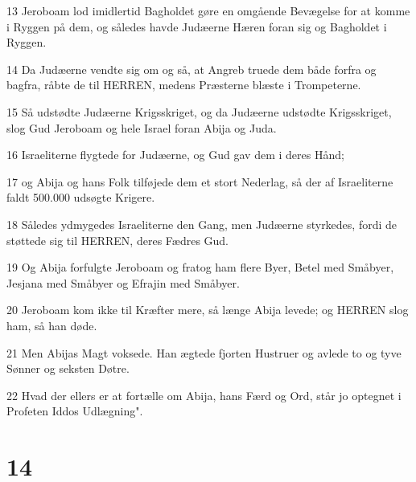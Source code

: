 \par 13 Jeroboam lod imidlertid Bagholdet gøre en omgående Bevægelse for at komme i Ryggen på dem, og således havde Judæerne Hæren foran sig og Bagholdet i Ryggen.
\par 14 Da Judæerne vendte sig om og så, at Angreb truede dem både forfra og bagfra, råbte de til HERREN, medens Præsterne blæste i Trompeterne.
\par 15 Så udstødte Judæerne Krigsskriget, og da Judæerne udstødte Krigsskriget, slog Gud Jeroboam og hele Israel foran Abija og Juda.
\par 16 Israeliterne flygtede for Judæerne, og Gud gav dem i deres Hånd;
\par 17 og Abija og hans Folk tilføjede dem et stort Nederlag, så der af Israeliterne faldt 500.000 udsøgte Krigere.
\par 18 Således ydmygedes Israeliterne den Gang, men Judæerne styrkedes, fordi de støttede sig til HERREN, deres Fædres Gud.
\par 19 Og Abija forfulgte Jeroboam og fratog ham flere Byer, Betel med Småbyer, Jesjana med Småbyer og Efrajin med Småbyer.
\par 20 Jeroboam kom ikke til Kræfter mere, så længe Abija levede; og HERREN slog ham, så han døde.
\par 21 Men Abijas Magt voksede. Han ægtede fjorten Hustruer og avlede to og tyve Sønner og seksten Døtre.
\par 22 Hvad der ellers er at fortælle om Abija, hans Færd og Ord, står jo optegnet i Profeten Iddos Udlægning".

\chapter{14}

